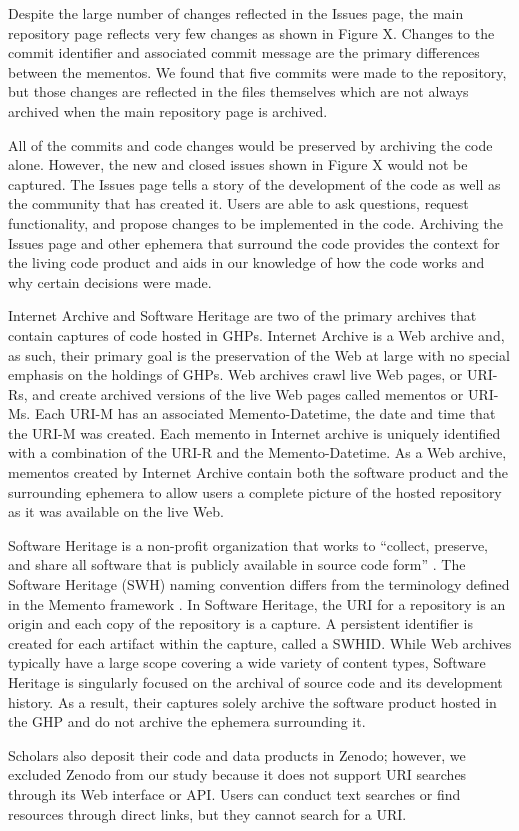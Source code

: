 Despite the large number of changes reflected in the Issues page, the main repository page reflects very few changes as shown in Figure X. Changes to the commit identifier and associated commit message are the primary differences between the mementos. We found that five commits were made to the repository, but those changes are reflected in the files themselves which are not always archived when the main repository page is archived. 

All of the commits and code changes would be preserved by archiving the code alone. However, the new and closed issues shown in Figure X would not be captured. The Issues page tells a story of the development of the code as well as the community that has created it. Users are able to ask questions, request functionality, and propose changes to be implemented in the code. Archiving the Issues page and other ephemera that surround the code provides the context for the living code product and aids in our knowledge of how the code works and why certain decisions were made. 

Internet Archive and Software Heritage are two of the primary archives that contain captures of code hosted in GHPs. Internet Archive is a Web archive and, as such, their primary goal is the preservation of the Web at large with no special emphasis on the holdings of GHPs. Web archives crawl live Web pages, or URI-Rs, and create archived versions of the live Web pages called mementos or URI-Ms. Each URI-M has an associated Memento-Datetime, the date and time that the URI-M was created. Each memento in Internet archive is uniquely identified with a combination of the URI-R and the Memento-Datetime. As a Web archive, mementos created by Internet Archive contain both the software product and the surrounding ephemera to allow users a complete picture of the hosted repository as it was available on the live Web.

Software Heritage is a non-profit organization that works to ``collect, preserve, and share all software that is publicly available in source code form'' \cite{swh-mission}. The Software Heritage (SWH) naming convention differs from the terminology defined in the Memento framework \cite{mementoprotocol}. In Software Heritage, the URI for a repository is an origin and each copy of the repository is a capture. A persistent identifier is created for each artifact within the capture, called a SWHID. While Web archives typically have a large scope covering a wide variety of content types, Software Heritage is singularly focused on the archival of source code and its development history. As a result, their captures solely archive the software product hosted in the GHP and do not archive the ephemera surrounding it. 

Scholars also deposit their code and data products in Zenodo; however, we excluded Zenodo from our study because it does not support URI searches through its Web interface or API. Users can conduct text searches or find resources through direct links, but they cannot search for a URI. 